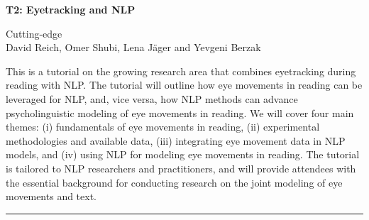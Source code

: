 \begin{center}
    \Large{\textbf{T2: Eyetracking and NLP}\\}
    \par\bigskip
    \large{Cutting-edge}\\
    \large{David Reich, Omer Shubi, Lena Jäger and Yevgeni Berzak}\\
    \par\bigskip
    [Website]

\end{center}

This is a tutorial on the growing research area that combines eyetracking during reading with NLP. The tutorial will outline how eye movements in reading can be leveraged for NLP, and, vice versa, how NLP methods can advance psycholinguistic modeling of eye movements in reading. We will cover four main themes: (i) fundamentals of eye movements in reading, (ii) experimental methodologies and available data, (iii) integrating eye movement data in NLP models, and (iv) using NLP for modeling eye movements in reading. The tutorial is tailored to NLP researchers and practitioners, and will provide attendees with the essential background for conducting research on the joint modeling of eye movements and text.

\begin{center}
    \noindent\rule{200px}{1pt}
\end{center}
